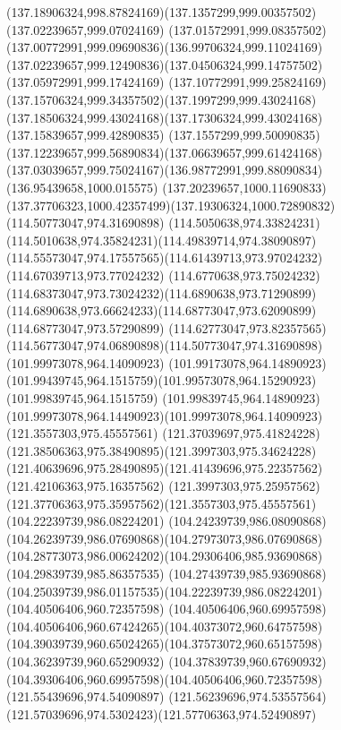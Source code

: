{    \curveto(137.18906324,998.87824169)(137.1357299,999.00357502)(137.02239657,999.07024169)
    \curveto(137.01572991,999.08357502)(137.00772991,999.09690836)(136.99706324,999.11024169)
    \curveto(137.02239657,999.12490836)(137.04506324,999.14757502)(137.05972991,999.17424169)
    \curveto(137.10772991,999.25824169)(137.15706324,999.34357502)(137.1997299,999.43024168)
    \curveto(137.18506324,999.43024168)(137.17306324,999.43024168)(137.15839657,999.42890835)
    \curveto(137.1557299,999.50090835)(137.12239657,999.56890834)(137.06639657,999.61424168)
    \curveto(137.03039657,999.75024167)(136.98772991,999.88090834)(136.95439658,1000.015575)
    \curveto(137.20239657,1000.11690833)(137.37706323,1000.42357499)(137.19306324,1000.72890832)
    \moveto(114.50773047,974.31690898)
    \curveto(114.5050638,974.33824231)(114.5010638,974.35824231)(114.49839714,974.38090897)
    \curveto(114.55573047,974.17557565)(114.61439713,973.97024232)(114.67039713,973.77024232)
    \curveto(114.6770638,973.75024232)(114.68373047,973.73024232)(114.6890638,973.71290899)
    \curveto(114.6890638,973.66624233)(114.68773047,973.62090899)(114.68773047,973.57290899)
    \curveto(114.62773047,973.82357565)(114.56773047,974.06890898)(114.50773047,974.31690898)
    \moveto(101.99973078,964.14090923)
    \lineto(101.99173078,964.14890923)
    \curveto(101.99439745,964.1515759)(101.99573078,964.15290923)(101.99839745,964.1515759)
    \curveto(101.99839745,964.14890923)(101.99973078,964.14490923)(101.99973078,964.14090923)
    \moveto(121.3557303,975.45557561)
    \curveto(121.37039697,975.41824228)(121.38506363,975.38490895)(121.3997303,975.34624228)
    \curveto(121.40639696,975.28490895)(121.41439696,975.22357562)(121.42106363,975.16357562)
    \curveto(121.3997303,975.25957562)(121.37706363,975.35957562)(121.3557303,975.45557561)
    \moveto(104.22239739,986.08224201)
    \curveto(104.24239739,986.08090868)(104.26239739,986.07690868)(104.27973073,986.07690868)
    \curveto(104.28773073,986.00624202)(104.29306406,985.93690868)(104.29839739,985.86357535)
    \curveto(104.27439739,985.93690868)(104.25039739,986.01157535)(104.22239739,986.08224201)
    \moveto(104.40506406,960.72357598)
    \curveto(104.40506406,960.69957598)(104.40506406,960.67424265)(104.40373072,960.64757598)
    \curveto(104.39039739,960.65024265)(104.37573072,960.65157598)(104.36239739,960.65290932)
    \curveto(104.37839739,960.67690932)(104.39306406,960.69957598)(104.40506406,960.72357598)
    \moveto(121.55439696,974.54090897)
    \curveto(121.56239696,974.53557564)(121.57039696,974.5302423)(121.57706363,974.52490897)
}
